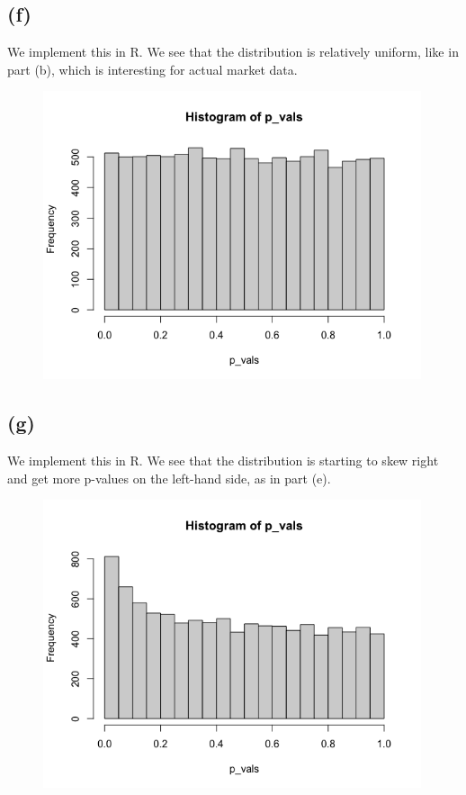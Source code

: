 \documentclass{article}
\begin{document}
{\subsection*{(f)}

We implement this in R. We see that the distribution is relatively uniform, like in part (b), which is interesting for actual market data.
\begin{figure}[h!]
  \centering
  \includegraphics[width=315pt]{hw7_2f.png}
\end{figure}

\subsection*{(g)}

We implement this in R. We see that the distribution is starting to skew right and get more p-values on the left-hand side, as in part (e).
\begin{figure}[h!]
  \centering
  \includegraphics[width=315pt]{hw7_2g.png}
\end{figure}

}
\end{document}
